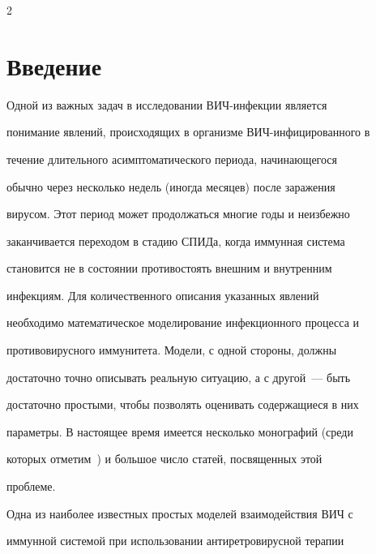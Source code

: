       \begin{multicols}{2}





      \label{st\stat}








\section{Введение}







Одной из важных задач в исследовании ВИЧ-ин\-фек\-ции  является


понимание явлений, происходящих в организме ВИЧ-инфицированного в


течение длительного асимптоматического периода, начинающегося


обычно через несколько недель (иногда месяцев) после заражения


вирусом. Этот период может продолжаться многие годы и неизбежно


заканчивается переходом в стадию СПИДа, когда иммунная система


становится не в состоянии противостоять внешним и внутренним


инфекциям. Для количественного описания указанных явлений


необходимо математическое моделирование инфекционного процесса и


противовирусного иммунитета. Модели, с одной стороны, должны


достаточно точно описывать реальную ситуацию, а с другой~--- быть


достаточно простыми, чтобы позволять оценивать содержащиеся в них


параметры. В настоящее время имеется несколько монографий (среди


которых отметим~\cite{1us}) и большое число статей, посвященных этой


проблеме.





Одна из наиболее известных простых моделей взаимодействия ВИЧ с


иммунной системой при использовании антиретровирусной терапии



\end{multicols}
